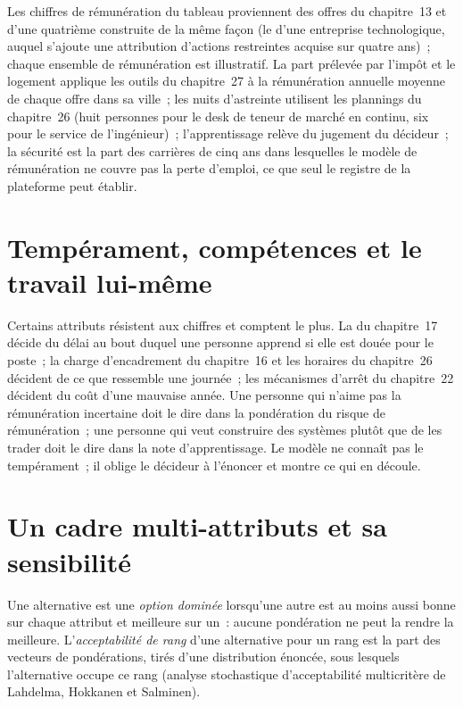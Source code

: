 Les chiffres de rémunération du tableau proviennent des offres du chapitre~13 et d'une quatrième construite de la même façon (le 
d'une entreprise technologique, auquel s'ajoute une attribution d'actions restreintes acquise sur quatre ans)~; chaque ensemble de rémunération est illustratif.
La part prélevée par l'impôt et le logement applique les outils du chapitre~27 à la rémunération annuelle moyenne de chaque offre dans sa ville~; les nuits d'astreinte utilisent les plannings du chapitre~26
(huit personnes pour le desk de teneur de marché en continu, six pour le service de l'ingénieur)~; l'apprentissage relève du jugement du décideur~;
la sécurité est la part des carrières de cinq ans dans lesquelles le modèle de rémunération ne couvre pas la perte d'emploi, ce que seul le registre
de la plateforme peut établir.

\section{Tempérament, compétences et le travail lui-même}

Certains attributs résistent aux chiffres et comptent le plus. La  du chapitre~17 décide du délai au bout duquel une personne apprend si
elle est douée pour le poste~; la charge d'encadrement du chapitre~16 et les horaires du chapitre~26 décident de ce que ressemble une journée~; les mécanismes d'arrêt du chapitre~22
décident du coût d'une mauvaise année. Une personne qui n'aime pas la rémunération incertaine doit le dire dans la pondération du risque de rémunération~; une
personne qui veut construire des systèmes plutôt que de les trader doit le dire dans la note d'apprentissage. Le modèle ne connaît pas le tempérament~;
il oblige le décideur à l'énoncer et montre ce qui en découle.

\section{Un cadre multi-attributs et sa sensibilité}

\begin{definition}\label{def:in:choosing:smaa}
Une alternative est une \emph{option dominée} lorsqu'une autre
est au moins aussi bonne sur chaque attribut et meilleure sur un~: aucune pondération ne peut la rendre la meilleure. L'\emph{acceptabilité de rang} d'une alternative
pour un rang est la part des vecteurs de pondérations, tirés d'une distribution énoncée, sous lesquels l'alternative occupe ce rang
(analyse stochastique d'acceptabilité multicritère de Lahdelma, Hokkanen et Salminen).
\end{definition}

